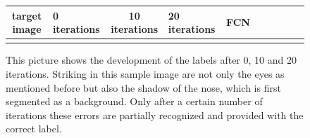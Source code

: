 \begin{figure}[h]
	\begin{center}
		\begin{tabular}{SC|SC|SC|SC|SC}
			 target image & 0 iterations & 10 iterations & 20 iterations & FCN\\ \hline
			 &
			 &
			 &
			&
			 \\
		\end{tabular}
	\end{center}
	\caption{This picture shows the development of the labels after 0, 10 and 20 iterations. Striking in this sample image are not only the eyes as mentioned before but also the shadow of the nose, which is first segmented as a background. Only after a certain number of iterations these errors are partially recognized and provided with the correct label.}
	\label{fig:iterations}
\end{figure}

